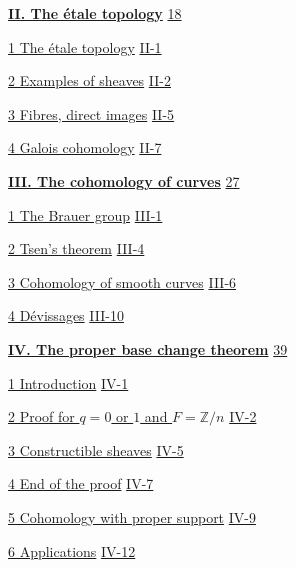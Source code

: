 \hyperref[I:2]{\textbf{II. The étale topology}}\dotfill
  \hyperref[I:2]{18}\par
\hspace*{1.5em}\hyperref[I:2-1]{1 The étale topology}\dotfill
  \hyperref[I:2-1]{II-1}\par
\hspace*{1.5em}\hyperref[I:2-2]{2 Examples of sheaves}\dotfill
  \hyperref[I:2-2]{II-2}\par
\hspace*{1.5em}\hyperref[I:2-3]{3 Fibres, direct images}\dotfill
  \hyperref[I:2-3]{II-5}\par
\hspace*{1.5em}\hyperref[I:2-4]{4 Galois cohomology}\dotfill
  \hyperref[I:2-4]{II-7}\par

\hyperref[I:3]{\textbf{III. The cohomology of curves}}\dotfill
  \hyperref[I:3]{27}\par
\hspace*{1.5em}\hyperref[I:3-1]{1 The Brauer group}\dotfill
  \hyperref[I:3-1]{III-1}\par
\hspace*{1.5em}\hyperref[I:3-2]{2 Tsen’s theorem}\dotfill
  \hyperref[I:3-2]{III-4}\par
\hspace*{1.5em}\hyperref[I:3-3]{3 Cohomology of smooth curves}\dotfill
  \hyperref[I:3-3]{III-6}\par
\hspace*{1.5em}\hyperref[I:3-4]{4 Dévissages}\dotfill
  \hyperref[I:3-4]{III-10}\par

\hyperref[I:4]{\textbf{IV. The proper base change theorem}}\dotfill
  \hyperref[I:4]{39}\par
\hspace*{1.5em}\hyperref[I:4-1]{1 Introduction}\dotfill
  \hyperref[I:4-1]{IV-1}\par
\hspace*{1.5em}\hyperref[I:4-2]{2 Proof for $q=0$ or $1$ and $F=\mathbb Z/n$}\dotfill
  \hyperref[I:4-2]{IV-2}\par
\hspace*{1.5em}\hyperref[I:4-3]{3 Constructible sheaves}\dotfill
  \hyperref[I:4-3]{IV-5}\par
\hspace*{1.5em}\hyperref[I:4-4]{4 End of the proof}\dotfill
  \hyperref[I:4-4]{IV-7}\par
\hspace*{1.5em}\hyperref[I:4-5]{5 Cohomology with proper support}\dotfill
  \hyperref[I:4-5]{IV-9}\par
\hspace*{1.5em}\hyperref[I:4-6]{6 Applications}\dotfill
  \hyperref[I:4-6]{IV-12}\par

